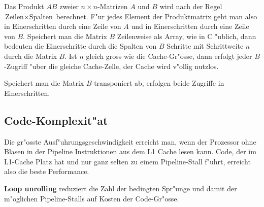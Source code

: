 \begin{beispiel}
Das Produkt $AB$ zweier $n\times n$-Matrizen $A$ und $B$ wird nach der Regel
$\text{Zeilen}\times \text{Spalten}$ berechnet. F"ur jedes Element
der Produktmatrix geht man also in Einerschritten durch eine Zeile
von $A$ und in Einerschritten durch eine Zeile von $B$.
Speichert man die Matrix $B$ Zeilenweise als Array, wie in C "ublich,
dann bedeuten die Einerschritte durch die Spalten von $B$ 
Schritte mit Schrittweite $n$ durch die Matrix $B$.
Ist $n$ gleich gross wie die Cache-Gr"osse, dann erfolgt jeder $B$-Zugriff
"uber die gleiche Cache-Zelle, der Cache wird v"ollig nutzlos.

Speichert man die Matrix $B$ transponiert ab, erfolgen beide Zugriffe
in Einerschritten.
\end{beispiel}


\subsection{Code-Komplexit"at}
Die gr"osste Ausf"uhrungsgeschwindigkeit erreicht man, wenn der
Prozessor ohne Blasen in der Pipeline Instruktionen aus dem
L1 Cache lesen kann. Code, der im L1-Cache Platz hat und nur ganz
selten zu einem Pipeline-Stall f"uhrt, erreicht also die beste
Performance.

{\bf Loop unrolling} reduziert die Zahl der bedingten Spr"unge und damit
der m"oglichen Pipeline-Stalls auf Kosten der Code-Gr"osse.

